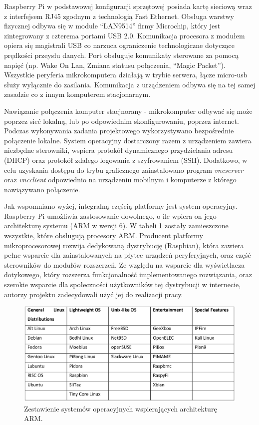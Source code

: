 Raspberry Pi w podstawowej konfiguracji sprzętowej posiada kartę sieciową wraz z interfejsem RJ45 zgodnym z technologią Fast Ethernet. Obsługa warstwy fizycznej odbywa się w module “LAN9514” firmy Microchip, który jest zintegrowany z czterema portami USB 2.0. Komunikacja procesora z modułem opiera się magistrali USB co narzuca ograniczenie technologiczne dotyczące prędkości przeysłu danych. Port obsługuje komunikaty sterowane za pomocą napięć (np. Wake On Lan, Zmiana statusu połączenia, “Magic Packet”). Wszystkie peryferia mikrokomputera działają w trybie serwera, łącze micro-usb służy wyłącznie do zasilania. Komunikacja z urządzeniem odbywa się na tej samej zasadzie co z innym komputerem stacjonarnym.

Nawiązanie połączenia komputer stacjnorany - mikrokomputer odbywać się może poprzez sieć lokalną, lub po odpowiednim skonfigurowaniu, poprzez internet. Podczas wykonywania zadania projektowego wykorzystywano bezpośrednie połączenie lokalne. System operacyjny dostarczony razem z urządzeniem zawiera niezbędne sterowniki, wspiera protokół dynamicznego przydzielania adresu (DHCP) oraz protokół zdalego logowania z szyfrowaniem (SSH). Dodatkowo, w celu uzyskania dostępu do trybu graficznego zainstalowano program \textit{vncserver} oraz \textit{vncclient} odpowiednio na urządzeniu mobilnym i komputerze z którego nawiązywano połączenie.

Jak wspomniano wyżej, integralną częścią platformy jest system operacyjny. Raspberry Pi umożliwia zastosowanie dowolnego, o ile wpiera on jego architekturę systemu (ARM w wersji 6). W tabeli \ref{figure:linux_comparison} zostały zamieszczone wszystkie, które obsługują procesory ARM. Producent platformy mikroprocesorowej rozwija dedykowaną dystrybucję (Raspbian), która zawiera pełne wsparcie dla zainstalowanych na płytce urządzeń peryferyjnych, oraz część sterowników do modułów rozszerzeń. Ze względu na wsparcie dla wyświetlacza dotykowego, który rozszerza funkcjonalność implementowanego rozwiązania, oraz szerokie wsparcie dla społeczności użytkowników tej dystrybucji w internecie, autorzy projektu zadecydowali użyć jej do realizacji pracy.



\begin{figure}[ht]
  \centering
  \includegraphics[width=\textwidth]{images/linux_zestawienie.png}
  \caption{Zestawienie systemów operacyjnych wspierających architekturę ARM\cite{bib:mgr-rpi}.}
  \label{figure:linux_comparison}
\end{figure}
\FloatBarrier

